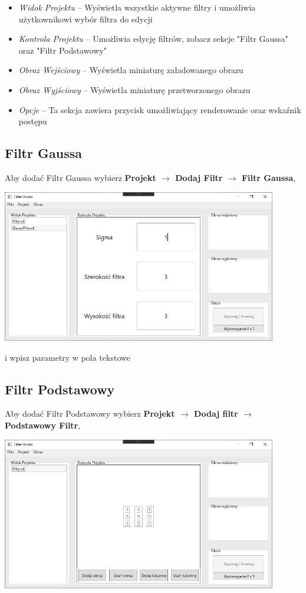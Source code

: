 \documentclass{article}
\begin{document}
\begin{itemize}
    \item \textit{Widok Projektu} -- Wyświetla wszystkie aktywne filtry i umożliwia użytkownikowi wybór filtra do edycji
    \item \textit{Kontrola Projektu} -- Umożliwia edycję filtrów, zobacz sekcje "Filtr Gaussa" oraz "Filtr Podstawowy"
    \item \textit{Obraz Wejściowy} -- Wyświetla miniaturę załadowanego obrazu
    \item \textit{Obraz Wyjściowy} -- Wyświetla miniaturę przetworzonego obrazu
    \item \textit{Opcje} -- Ta sekcja zawiera przycisk umożliwiający renderowanie oraz wskaźnik postępu
\end{itemize}

\newpage
\subsection{Filtr Gaussa}
Aby dodać Filtr Gaussa wybierz \textbf{Projekt $\rightarrow$ Dodaj Filtr $\rightarrow$ Filtr Gaussa},

\bigskip
\includegraphics[width=0.9\textwidth]{gauss.png}
\bigskip

i wpisz parametry w pola tekstowe

\subsection{Filtr Podstawowy}
Aby dodać Filtr Podstawowy wybierz \textbf{Projekt $\rightarrow$ Dodaj filtr $\rightarrow$ Podstawowy Filtr},

\bigskip
\includegraphics[width=0.9\textwidth]{matrix.png}
\bigskip
\end{document}
